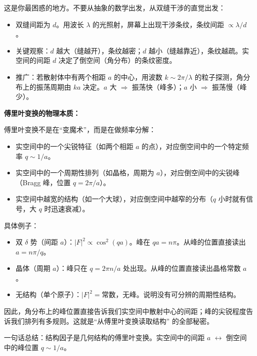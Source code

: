 \begin{derivationbox}
这是你最困惑的地方。不要从抽象的数学出发，从双缝干涉的直觉出发：
\begin{itemize}
    \item 双缝间距为 $d$。用波长 $\lambda$ 的光照射，屏幕上出现干涉条纹，条纹间距 $\propto \lambda/d$。
    \item 关键观察：$d$ 越大（缝越开），条纹越密；$d$ 越小（缝越靠近），条纹越疏。实空间的间距 $d$ 决定了倒空间（角分布）的条纹密度。
    \item 推广：若散射体中有两个相距 $a$ 的中心，用波数 $k \sim 2\pi/\lambda$ 的粒子探测，角分布上的振荡周期由 $ka$ 决定。$a$ 大 $\Rightarrow$ 振荡快（峰多）；$a$ 小 $\Rightarrow$ 振荡慢（峰少）。
\end{itemize}

\textbf{傅里叶变换的物理本质：}

傅里叶变换不是在``变魔术''，而是在做频率分解：
\begin{itemize}
    \item 实空间中的一个尖锐特征（如两个相距 $a$ 的点），对应倒空间中的一个特定频率 $q \sim 1/a$。
    \item 实空间中的一个周期性排列（如晶格，周期为 $a$），对应倒空间中的尖锐峰（Bragg 峰，位置 $q = 2\pi/a$）。
    \item 实空间中越宽的结构（如一个大球），对应倒空间中越窄的分布（$q$ 小时就有信号，大 $q$ 时迅速衰减）。
\end{itemize}

具体例子：
\begin{itemize}
    \item 双 $\delta$ 势（间距 $a$）：$|F|^2 \propto \cos^2(qa)$。峰在 $qa = n\pi$。从峰的位置直接读出 $a = n\pi/q$。
    \item 晶体（周期 $a$）：峰只在 $q = 2\pi n/a$ 处出现。从峰的位置直接读出晶格常数 $a$。
    \item 无结构（单个原子）：$|F|^2 = \text{常数}$，无峰。说明没有可分辨的周期性结构。
\end{itemize}

因此，角分布上的峰位置直接告诉我们实空间中散射中心的间距；峰的尖锐程度告诉我们排列有多规则。这就是``从傅里叶变换读取结构'' 的全部秘密。

一句话总结：结构因子是几何结构的傅里叶变换。实空间中的间距 $a$ $\leftrightarrow$ 倒空间中的峰位置 $q \sim 1/a$。
\end{derivationbox}

